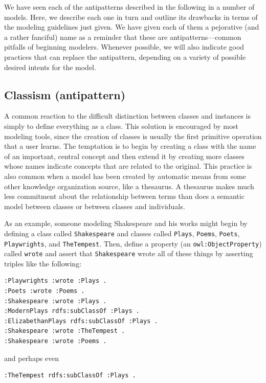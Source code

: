 We have seen each of the antipatterns described in the following in a
number of models. Here, we describe each one in turn and outline its
drawbacks in terms of the modeling guidelines just given. We have given
each of them a pejorative (and a rather fanciful) name as a reminder
that these are
antipatterns---common pitfalls of beginning modelers. Whenever possible,
we will also indicate good practices that can replace the antipattern,
depending on a variety of possible desired intents for the model.

\subsection{Classism (antipattern)}
\label{ch15:classism}

A common reaction to the difficult distinction between classes and
instances is simply to define everything as a class. This solution is
encouraged by most modeling tools, since the creation of classes is
usually the first primitive operation that a user learns. The temptation
is to begin by creating a class with the name of an important, central
concept and then extend it by creating more classes whose names indicate
concepts that are related to the original. This practice is also common
when a model has been created by automatic means from some other
knowledge organization source, like a thesaurus. A thesaurus makes much
less commitment about the relationship between terms than does a
semantic model between classes or between classes and individuals.

As an example, someone modeling Shakespeare and his works might begin by
defining a class called \texttt{Shakespeare} and classes called \texttt{Plays}, \texttt{Poems},
\texttt{Poets}, \texttt{Playwrights}, and \texttt{TheTempest}. Then, define a property (an
\texttt{owl:ObjectProperty}) called \texttt{wrote} and assert that \texttt{Shakespeare} wrote all
of these things by asserting triples like the following:

\begin{lstlisting}
:Playwrights :wrote :Plays .
:Poets :wrote :Poems .
:Shakespeare :wrote :Plays .
:ModernPlays rdfs:subClassOf :Plays .
:ElizabethanPlays rdfs:subClassOf :Plays .
:Shakespeare :wrote :TheTempest . 
:Shakespeare :wrote :Poems .
\end{lstlisting}

and perhaps even

\begin{lstlisting}
:TheTempest rdfs:subClassOf :Plays .
\end{lstlisting}

